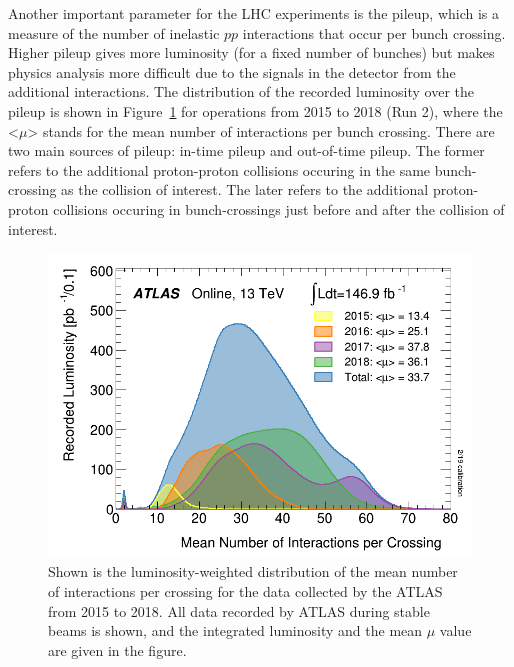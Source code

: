 Another important parameter for the LHC experiments is the pileup, 
which is a measure of the number of inelastic $pp$ interactions that occur per bunch crossing. 
Higher pileup gives more luminosity (for a fixed number of bunches) 
but makes physics analysis more difficult due to the signals in the detector 
from the additional interactions. The distribution of the recorded luminosity over
the pileup is shown in Figure~\ref{fig:Run2_pileup} for operations from 2015 to 2018 (Run 2), 
where the <$\mu$> stands for the mean number of interactions per bunch crossing.
There are two main sources of pileup: in-time pileup and out-of-time pileup.
The former refers to the additional proton-proton collisions occuring in
the same bunch-crossing as the collision of interest. 
The later refers to the additional proton-proton collisions occuring
in bunch-crossings just before and after the collision of interest. 
\begin{figure}[bht]
	\begin{centering}	
	\includegraphics[width=.6\textwidth]{Detector_plots/Run2_pileup.png}
	\caption{Shown is the luminosity-weighted distribution of the mean number of 
	interactions per crossing for the data collected by the ATLAS from 2015 to 2018. 
	All data recorded by ATLAS during stable beams is shown, and the integrated luminosity and 
	the mean $\mu$ value are given in the figure. 
		}
	\label{fig:Run2_pileup}
	\end{centering}
\end{figure}



